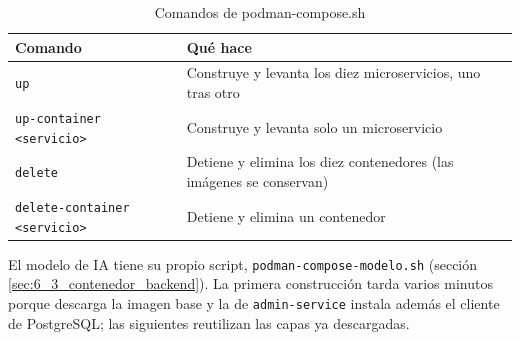 \begin{table}[H]
\centering
\caption{Comandos de podman-compose.sh}
\small
\begin{tabular}{p{5.6cm}p{8.8cm}}
\toprule
\textbf{Comando} & \textbf{Qué hace} \\
\midrule
\texttt{up} & Construye y levanta los diez microservicios, uno tras otro \\
\texttt{up-container <servicio>} & Construye y levanta solo un microservicio \\
\texttt{delete} & Detiene y elimina los diez contenedores (las imágenes se conservan) \\
\texttt{delete-container <servicio>} & Detiene y elimina un contenedor \\
\bottomrule
\end{tabular}
\end{table}
El modelo de IA tiene su propio script, \texttt{podman-compose-modelo.sh} (sección \ref{sec:6_3_contenedor_backend}). La primera construcción tarda varios minutos porque descarga la imagen base y la de \texttt{admin-service} instala además el cliente de PostgreSQL; las siguientes reutilizan las capas ya descargadas.
